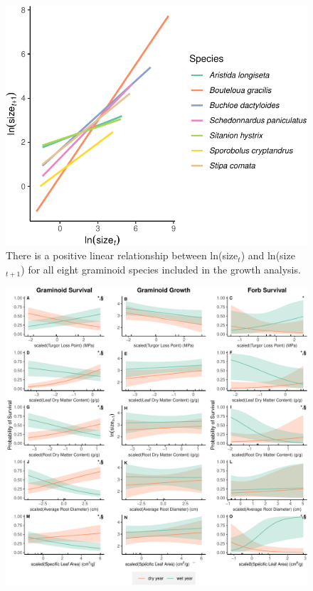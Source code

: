 \documentclass[12pt, letterpaper]{article}
\begin{document}
\begin{figure}
    \centering
    \includegraphics[width=.7\textwidth]{figures/SizeCompFig-1.pdf}
    \caption{There is a positive linear relationship between ln(size$_{t}$) and ln(size$_{t+1}$) for all eight graminoid species included in the growth analysis. }
    \label{fig:SizeBySize}
\end{figure}

\begin{figure}
\captionsetup{labelformat=empty}
\includegraphics[width=1\textwidth]{mainObservationsFig-1.pdf}
\caption{}
\label{fig:PredsObs}
\end{figure}
\clearpage
\end{document}
